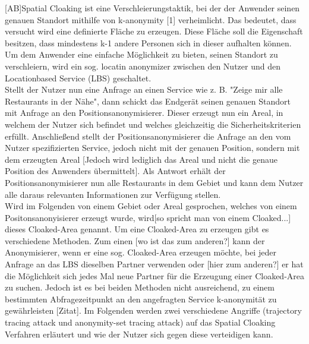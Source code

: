 [AB]Spatial Cloaking ist eine Verschleierungstaktik, bei der der Anwender seinen genauen Standort mithilfe von k-anonymity [1] verheimlicht. Das bedeutet, dass versucht wird eine definierte Fläche zu erzeugen. Diese Fläche soll die Eigenschaft besitzen, dass mindestens k-1 andere Personen sich in dieser aufhalten können. Um dem Anwender eine einfache Möglichkeit zu bieten, seinen Standort zu verschleiern, wird ein sog. locatin anonymizer zwischen den Nutzer und den Locationbased Service (LBS) geschaltet. \\ Stellt der Nutzer nun eine Anfrage an einen Service wie z. B. "Zeige mir alle Restaurants in der Nähe", dann schickt das Endgerät seinen genauen Standort mit Anfrage an den Positionsanonymisierer. Dieser erzeugt nun ein Areal, in welchem der Nutzer sich befindet und welches gleichzeitig die Sicherheitskriterien erfüllt. Anschließend stellt der Positionsanonymisierer die Anfrage an den vom Nutzer spezifizierten Service, jedoch nicht mit der genauen Position, sondern mit dem erzeugten Areal [Jedoch wird lediglich das Areal und nicht die genaue Position des Anwenders übermittelt]. Als Antwort erhält der Positionsanonymisierer nun alle Restaurants in dem Gebiet und kann dem Nutzer alle daraus relevanten Informationen zur Verfügung stellen.\\ Wird im Folgenden von einem Gebiet oder Areal gesprochen, welches von einem Positonsanonyisierer erzeugt wurde, wird[so spricht man von einem Cloaked...] dieses Cloaked-Area genannt. Um eine Cloaked-Area zu erzeugen gibt es verschiedene Methoden. Zum einen [wo ist das zum anderen?] kann der Anonymisierer, wenn er eine sog. Cloaked-Area erzeugen möchte, bei jeder Anfrage an das LBS dieselben Partner verwenden oder [hier zum anderen?] er hat die Möglichkeit sich jedes Mal neue Partner für die Erzeugung einer Cloaked-Area zu suchen. Jedoch ist es bei beiden Methoden nicht ausreichend, zu einem bestimmten Abfragezeitpunkt an den angefragten Service k-anonymität zu gewährleisten [Zitat]. Im Folgenden werden zwei verschiedene Angriffe (trajectory tracing attack und anonymity-set tracing attack) auf das Spatial Cloaking Verfahren erläutert und wie der Nutzer sich gegen diese verteidigen kann. 
